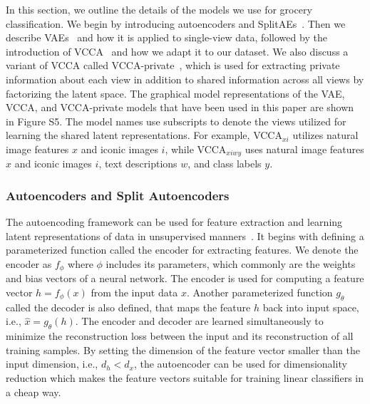 In this section, we outline the details of the models we use for grocery classification.
We begin by introducing autoencoders and SplitAEs~\cite{wang2015deep}. Then we describe VAEs~\cite{kingma2013auto} and how it is applied to single-view data, followed by the introduction of VCCA~\cite{wang2016deep} and how we adapt it to our dataset. We also discuss a variant of VCCA called VCCA-private~\cite{wang2016deep}, which is used for extracting private information about each view in addition to shared information across all views by factorizing the latent space. The graphical model representations of the VAE, VCCA, and VCCA-private models that have been used in this paper are shown in Figure S5. The model names use subscripts to denote the views utilized for learning the shared latent representations. For example, VCCA$_{x i}$ utilizes natural image features $x$ and iconic images $i$, while VCCA$_{x i w y}$ uses natural image features $x$ and iconic images $i$, text descriptions $w$, and class labels $y$.

\subsubsection{Autoencoders and Split Autoencoders}
\label{sec:autoencoders_and_split_autoencoders}

The autoencoding framework can be used for feature extraction and learning latent representations of data in unsupervised manners~\cite{bengio2013representation}. It begins with defining a parameterized function called the encoder for extracting features. We denote the encoder as $f_{\phi}$ where $\phi$ includes its parameters, which commonly are the weights and bias vectors of a neural network. The encoder is used for computing a feature vector $h = f_{\phi}(x)$ from the input data $x$. Another parameterized function $g_{\theta}$ called the decoder is also defined, that maps the feature $h$ back into input space, i.e., $\hat{x} = g_{\theta}(h)$. The encoder and decoder are learned simultaneously to minimize the reconstruction loss between the input and its reconstruction of all training samples. By setting the dimension of the feature vector smaller than the input dimension, i.e., $d_{h} < d_{x}$, the autoencoder can be used for dimensionality reduction which makes the feature vectors suitable for training linear classifiers in a cheap way.

